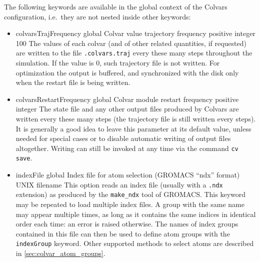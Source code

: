 The following keywords are available in the global context of the Colvars configuration, i.e.~they are not nested inside other keywords:
\begin{itemize}

\item %
  \keydef
    {colvarsTrajFrequency}{%
    global}{%
  Colvar value trajectory frequency}{%
    positive integer}{%
    100}{%
    The values of each colvar (and of other related quantities, if requested) are written to the file \outputName\texttt{.colvars.traj} every these many steps throughout the simulation.
    If the value is 0, such trajectory file is not written.
    For optimization the output is buffered, and synchronized with the disk only when the restart file is being written.}

\item %
  \keydef
    {colvarsRestartFrequency}{%
    global}{%
    Colvar module restart frequency}{%
    positive integer}{%
    }{%
    The state file and any other output files produced by Colvars are written every these many steps (the trajectory file is still written every  steps).
    It is generally a good idea to leave this parameter at its default value, unless needed for special cases or to disable automatic writing of output files altogether.
    Writing can still be invoked at any time via the command \texttt{cv save}.}

\item %
  \key
    {indexFile}{%
    global}{%
    Index file for atom selection (GROMACS ``ndx'' format)}{%
    UNIX filename}{%
    This option reads an index file (usually with a \texttt{.ndx}
    extension) as produced by the \texttt{make\_ndx} tool of GROMACS.
    This keyword may be repeated to load multiple index files.
    A group with the same name may appear multiple times, as long as it contains the same indices in identical order each time: an error is raised otherwise.
    The names of index groups contained in this file can then be used to define
    atom groups with the \texttt{indexGroup} keyword.
    Other supported methods to select atoms are described in \ref{sec:colvar_atom_groups}.
  }


\end{itemize}
